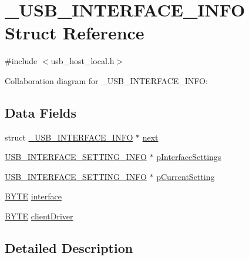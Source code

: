 \hypertarget{struct___u_s_b___i_n_t_e_r_f_a_c_e___i_n_f_o}{}\section{\+\_\+\+U\+S\+B\+\_\+\+I\+N\+T\+E\+R\+F\+A\+C\+E\+\_\+\+I\+N\+F\+O Struct Reference}
\label{struct___u_s_b___i_n_t_e_r_f_a_c_e___i_n_f_o}


{\ttfamily \#include $<$usb\+\_\+host\+\_\+local.\+h$>$}



Collaboration diagram for \+\_\+\+U\+S\+B\+\_\+\+I\+N\+T\+E\+R\+F\+A\+C\+E\+\_\+\+I\+N\+F\+O\+:
\subsection*{Data Fields}
\begin{DoxyCompactItemize}
\item 
struct \hyperlink{struct___u_s_b___i_n_t_e_r_f_a_c_e___i_n_f_o}{\+\_\+\+U\+S\+B\+\_\+\+I\+N\+T\+E\+R\+F\+A\+C\+E\+\_\+\+I\+N\+F\+O} $\ast$ \hyperlink{struct___u_s_b___i_n_t_e_r_f_a_c_e___i_n_f_o_a9bab1215772b2a0a81f52d514221f944}{next}
\item 
\hyperlink{usb__host__local_8h_a3ee2137df92417c10cfe786ba5473ed0}{U\+S\+B\+\_\+\+I\+N\+T\+E\+R\+F\+A\+C\+E\+\_\+\+S\+E\+T\+T\+I\+N\+G\+\_\+\+I\+N\+F\+O} $\ast$ \hyperlink{struct___u_s_b___i_n_t_e_r_f_a_c_e___i_n_f_o_a12794164365e1fd1fb8e87d6e5365732}{p\+Interface\+Settings}
\item 
\hyperlink{usb__host__local_8h_a3ee2137df92417c10cfe786ba5473ed0}{U\+S\+B\+\_\+\+I\+N\+T\+E\+R\+F\+A\+C\+E\+\_\+\+S\+E\+T\+T\+I\+N\+G\+\_\+\+I\+N\+F\+O} $\ast$ \hyperlink{struct___u_s_b___i_n_t_e_r_f_a_c_e___i_n_f_o_ab3000e39cccff71edc370a0dc8862776}{p\+Current\+Setting}
\item 
\hyperlink{_generic_type_defs_8h_a4ae1dab0fb4b072a66584546209e7d58}{B\+Y\+T\+E} \hyperlink{struct___u_s_b___i_n_t_e_r_f_a_c_e___i_n_f_o_a6e65d646f7737013c8389976f1e27806}{interface}
\item 
\hyperlink{_generic_type_defs_8h_a4ae1dab0fb4b072a66584546209e7d58}{B\+Y\+T\+E} \hyperlink{struct___u_s_b___i_n_t_e_r_f_a_c_e___i_n_f_o_a4ee215657b94c3ce8c340d29a1c551e3}{client\+Driver}
\end{DoxyCompactItemize}


\subsection{Detailed Description}


